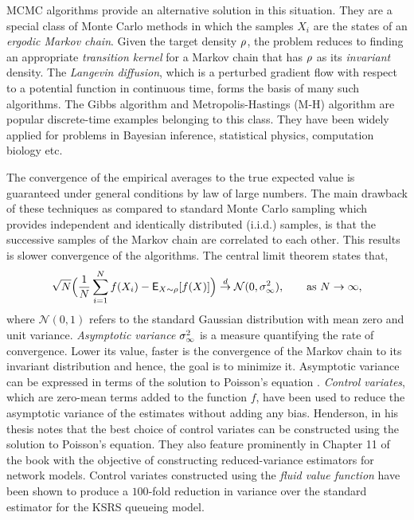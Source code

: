 MCMC algorithms provide an alternative solution in this situation. They are a special class of Monte Carlo methods in which the samples $X_i$ are the states of an \textit{ergodic Markov chain}. Given the target density $\rho$, the problem reduces to finding an appropriate \textit{transition kernel} for a Markov chain that has $\rho$ as its \textit{invariant} density. The \textit{Langevin diffusion}, which is a perturbed gradient flow with respect to a potential function in continuous time, forms the basis of many such algorithms. The Gibbs algorithm \cite{tanwon87} and Metropolis-Hastings (M-H)  algorithm \cite{has70} are popular discrete-time examples belonging to this class. They have been widely applied for problems in Bayesian inference, statistical physics, computation biology etc.

The convergence of the empirical averages to the true expected value is guaranteed under general conditions by law of large numbers. The main drawback of these techniques as compared to standard Monte Carlo sampling which provides independent and identically distributed (i.i.d.) samples, is that the successive samples of the Markov chain are correlated to each other. This results is slower convergence of the algorithms. The central limit theorem states that,
\begin{equation}
\sqrt{N} \Bigl(\frac{1}{N} \sum_{i=1}^N f(X_i) - {\sf E}_{X \sim \rho} [f(X)] \Bigr) \overset{d}{\to} \mathcal{N}(0, \sigma_\infty^2),\qquad \text{as } N \to \infty, 
\end{equation}
where $\mathcal{N}(0,1)$ refers to the standard Gaussian distribution with mean zero and unit variance. \textit{Asymptotic variance} $\sigma_\infty^2$ is a measure quantifying the rate of convergence. Lower its value, faster is the convergence of the Markov chain to its invariant distribution and hence, the goal is to minimize it. Asymptotic variance can be expressed in terms of the solution to Poisson's equation \cite{ctcn}. \textit{Control variates}, which are zero-mean terms added to the function $f$, have been used to reduce the asymptotic variance of the estimates without adding any bias. Henderson, in his thesis \cite{henthesis97} notes that the best choice of control variates can be constructed using the solution to Poisson's equation. They also feature prominently in Chapter 11 of the book \cite{ctcn} with the objective of constructing reduced-variance estimators for network models. Control variates constructed using the \textit{fluid value function} have been shown to produce a $100$-fold reduction in variance over the standard estimator for the KSRS queueing model. 

